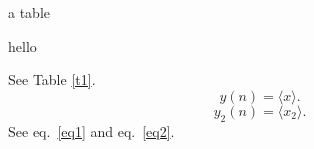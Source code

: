 \documentclass{article}
\begin{document}
\begin{table}
a table
  \caption{hello}\label{t1}
\end{table}

See Table \ref{t1}.
\begin{equation} 
y(n) = \langle x\rangle. %
\label{eq1}
\end{equation}
\begin{equation} 
y_2(n) = \langle x_2\rangle. %
\label{eq2}
\end{equation} 
See eq.~\ref{eq1} and eq.~\ref{eq2}.


\printindex
\end{document}
